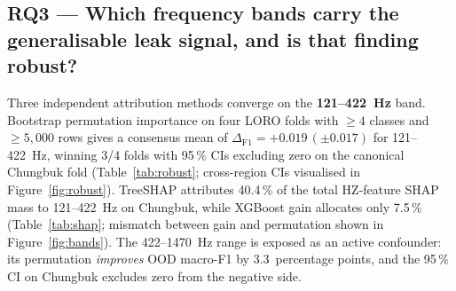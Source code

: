 \documentclass[3p,times,authoryear]{elsarticle}
\theoremstyle{remark}
\begin{document}
\subsection{RQ3 --- Which frequency bands carry the generalisable leak signal, and is that finding robust?}\label{sec:res-rq3}

Three independent attribution methods converge on the
\textbf{121--422~Hz} band. Bootstrap permutation importance
on four LORO folds with $\geq 4$ classes and $\geq 5{,}000$ rows
gives a consensus mean of $\Delta_{\mathrm{F1}} = +0.019\,
(\pm 0.017)$ for 121--422~Hz, winning 3/4 folds with 95\,\% CIs
excluding zero on the canonical Chungbuk fold
(Table~\ref{tab:robust}; cross-region CIs visualised in
Figure~\ref{fig:robust}). TreeSHAP attributes 40.4\,\% of the
total HZ-feature SHAP mass to 121--422~Hz on Chungbuk, while
XGBoost gain allocates only 7.5\,\%
(Table~\ref{tab:shap}; mismatch between gain and permutation
shown in Figure~\ref{fig:bands}). The 422--1470~Hz range is
exposed as an active confounder: its permutation
\emph{improves} OOD macro-F1 by 3.3~percentage points, and the
95\,\% CI on Chungbuk excludes zero from the negative side.

\begin{table}[!htbp]
\caption{Bootstrap 95\,\% CIs ($B = 100$) of band-group
$\Delta_{\mathrm{F1}}$ on each LORO fold. The 121--422~Hz band
is the dominant positive contributor in three of four
regions.\label{tab:robust}}
\centering
\scriptsize
\setlength{\tabcolsep}{3pt}
\end{table}
\end{document}
